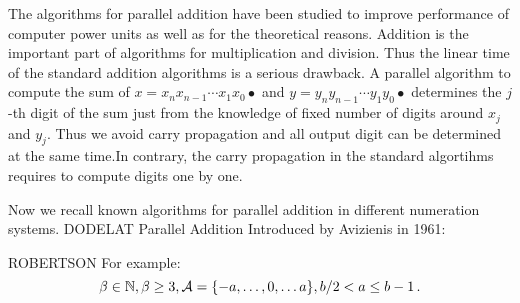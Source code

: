 The algorithms for parallel addition have been studied to improve performance of computer power units as well as for the theoretical reasons. Addition is the important part of algorithms for multiplication and division. Thus the linear time of the standard addition algorithms is a serious drawback. A parallel algorithm to compute the sum of $x=x_n x_{n-1}\cdots x_1 x_0 \bullet$ and $y=y_n y_{n-1}\cdots y_1 y_0 \bullet$ determines the $j$-th digit of the sum just from the knowledge of fixed number of digits around $x_j$ and $y_j$. Thus we avoid carry propagation and all output digit can be determined at the same time.In contrary, the carry propagation in the standard algortihms requires to compute digits one by one.






Now we recall known algorithms for parallel addition in different numeration systems. 
DODELAT 
    {Parallel Addition}
    Introduced by Avizienis in 1961:
  
  ROBERTSON
  For example:
  $$
  \beta \in \mathbb{N}, \beta \geq 3, \mathcal{A}=\{-a, \dots, 0, \dots a\}, b/2 <a \leq b-1\,. 
  $$  
  